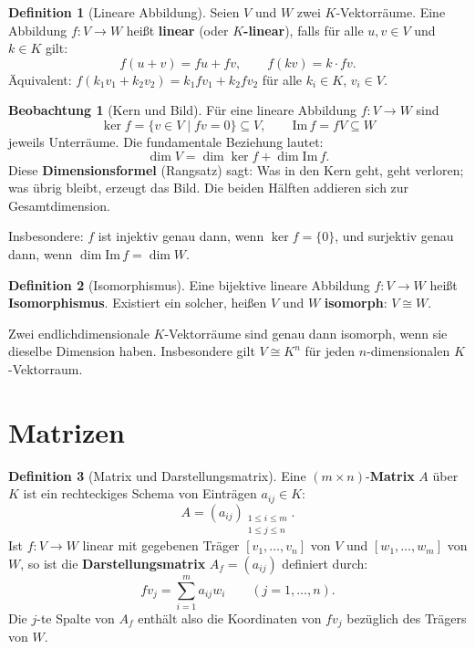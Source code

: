 ﻿\documentclass[a4paper,12pt]{report}
\theoremstyle{definition}
\newtheorem{definition}{Definition}
\newtheorem{beobachtung}{Beobachtung}
\begin{document}
\begin{definition}[Lineare Abbildung]
    Seien $V$ und $W$ zwei $K$-Vektorräume. Eine Abbildung
    $f : V \to W$ heißt \textbf{linear} (oder \textbf{$K$-linear}), falls
    für alle $u, v \in V$ und $k \in K$ gilt:
    \[
        f(u + v) = fu + fv, \qquad f(kv) = k \cdot fv.
    \]
    Äquivalent: $f(k_1 v_1 + k_2 v_2) = k_1 f v_1 + k_2 f v_2$ für alle
    $k_i \in K$, $v_i \in V$.
\end{definition}

\begin{beobachtung}[Kern und Bild]
    Für eine lineare Abbildung $f : V \to W$ sind
    \[
        \ker f = \{v \in V \mid fv = 0\} \subseteq V, \qquad
        \mathrm{Im}\, f = fV \subseteq W
    \]
    jeweils Unterräume. Die fundamentale Beziehung lautet:
    \[
        \dim V = \dim \ker f + \dim \mathrm{Im}\, f.
    \]
    Diese \textbf{Dimensionsformel} (Rangsatz) sagt: Was in den Kern geht,
    geht verloren; was übrig bleibt, erzeugt das Bild. Die beiden Hälften
    addieren sich zur Gesamtdimension.

    Insbesondere: $f$ ist injektiv genau dann, wenn $\ker f = \{0\}$, und
    surjektiv genau dann, wenn $\dim \mathrm{Im}\, f = \dim W$.
\end{beobachtung}

\begin{definition}[Isomorphismus]
    Eine bijektive lineare Abbildung $f : V \to W$ heißt
    \textbf{Isomorphismus}. Existiert ein solcher, heißen $V$ und $W$
    \textbf{isomorph}: $V \cong W$.

    Zwei endlichdimensionale $K$-Vektorräume sind genau dann isomorph,
    wenn sie dieselbe Dimension haben. Insbesondere gilt $V \cong K^n$
    für jeden $n$-dimensionalen $K$-Vektorraum.
\end{definition}

\section{Matrizen}

\begin{definition}[Matrix und Darstellungsmatrix]
    Eine $(m \times n)$-\textbf{Matrix} $A$ über $K$ ist ein rechteckiges
    Schema von Einträgen $a_{ij} \in K$:
    \[
        A = (a_{ij})_{\substack{1 \le i \le m \\ 1 \le j \le n}}.
    \]
    Ist $f : V \to W$ linear mit gegebenen Träger $[v_1, \dots, v_n]$ von $V$
    und $[w_1, \dots, w_m]$ von $W$, so ist die \textbf{Darstellungsmatrix}
    $A_f = (a_{ij})$ definiert durch:
    \[
        f v_j = \sum_{i=1}^m a_{ij} w_i \qquad (j = 1, \dots, n).
    \]
    Die $j$-te Spalte von $A_f$ enthält also die Koordinaten von $fv_j$
    bezüglich des Trägers von $W$.
\end{definition}
\end{document}
